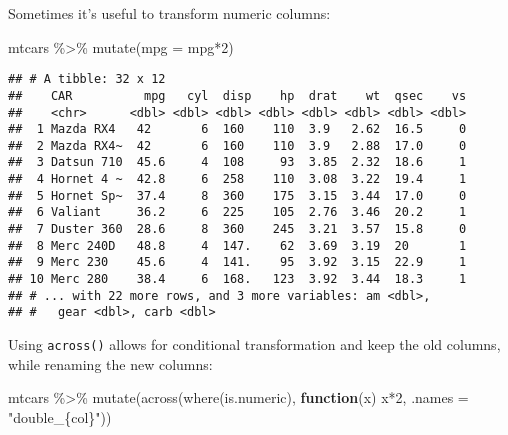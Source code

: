 \documentclass[
]{book}
\newenvironment{Shaded}{\begin{snugshade}}{\end{snugshade}}
\newcommand{\AttributeTok}[1]{\textcolor[rgb]{0.77,0.63,0.00}{#1}}
\newcommand{\ControlFlowTok}[1]{\textcolor[rgb]{0.13,0.29,0.53}{\textbf{#1}}}
\newcommand{\DecValTok}[1]{\textcolor[rgb]{0.00,0.00,0.81}{#1}}
\newcommand{\FunctionTok}[1]{\textcolor[rgb]{0.00,0.00,0.00}{#1}}
\newcommand{\NormalTok}[1]{#1}
\newcommand{\SpecialCharTok}[1]{\textcolor[rgb]{0.00,0.00,0.00}{#1}}
\newcommand{\StringTok}[1]{\textcolor[rgb]{0.31,0.60,0.02}{#1}}
\begin{document}
Sometimes it's useful to transform numeric columns:

\begin{Shaded}
\begin{Highlighting}[]
\NormalTok{mtcars }\SpecialCharTok{\%\textgreater{}\%} \FunctionTok{mutate}\NormalTok{(}\AttributeTok{mpg =}\NormalTok{ mpg}\SpecialCharTok{*}\DecValTok{2}\NormalTok{)}
\end{Highlighting}
\end{Shaded}

\begin{verbatim}
## # A tibble: 32 x 12
##    CAR          mpg   cyl  disp    hp  drat    wt  qsec    vs
##    <chr>      <dbl> <dbl> <dbl> <dbl> <dbl> <dbl> <dbl> <dbl>
##  1 Mazda RX4   42       6  160    110  3.9   2.62  16.5     0
##  2 Mazda RX4~  42       6  160    110  3.9   2.88  17.0     0
##  3 Datsun 710  45.6     4  108     93  3.85  2.32  18.6     1
##  4 Hornet 4 ~  42.8     6  258    110  3.08  3.22  19.4     1
##  5 Hornet Sp~  37.4     8  360    175  3.15  3.44  17.0     0
##  6 Valiant     36.2     6  225    105  2.76  3.46  20.2     1
##  7 Duster 360  28.6     8  360    245  3.21  3.57  15.8     0
##  8 Merc 240D   48.8     4  147.    62  3.69  3.19  20       1
##  9 Merc 230    45.6     4  141.    95  3.92  3.15  22.9     1
## 10 Merc 280    38.4     6  168.   123  3.92  3.44  18.3     1
## # ... with 22 more rows, and 3 more variables: am <dbl>,
## #   gear <dbl>, carb <dbl>
\end{verbatim}

Using \texttt{across()} allows for conditional transformation and keep the old columns, while renaming the new columns:

\begin{Shaded}
\begin{Highlighting}[]
\NormalTok{mtcars }\SpecialCharTok{\%\textgreater{}\%} 
  \FunctionTok{mutate}\NormalTok{(}\FunctionTok{across}\NormalTok{(}\FunctionTok{where}\NormalTok{(is.numeric), }\ControlFlowTok{function}\NormalTok{(x) x}\SpecialCharTok{*}\DecValTok{2}\NormalTok{, }\AttributeTok{.names =} \StringTok{"double\_\{col\}"}\NormalTok{))}
\end{Highlighting}
\end{Shaded}
\end{document}
